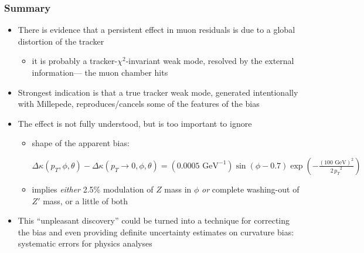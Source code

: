 \documentclass[compress]{beamer}
\begin{document}
\begin{frame}
\frametitle{Summary}
\begin{itemize}
\item There is evidence that a persistent effect in muon residuals is
  due to a global distortion of the tracker
\begin{itemize}
\item it is probably a tracker-$\chi^2$-invariant weak mode, resolved
  by the external information--- the muon chamber hits
\end{itemize}

\item Strongest indication is that a true tracker weak mode, generated
  intentionally with Millepede, reproduces/cancels some of the
  features of the bias

\item The effect is not fully understood, but is too important to ignore
\begin{itemize}
\item shape of the apparent bias:

\vspace{0.2 cm}
{\hspace{-1.5 cm}\begin{minipage}{1.2\linewidth}\scriptsize
$\displaystyle \Delta \kappa(p_T, \phi, \theta) - \Delta \kappa(p_T \to 0, \phi, \theta) = (0.0005\mbox{ GeV}^{-1}) \sin(\phi - 0.7) \exp\left(-\frac{(100\mbox{ GeV})^2}{{2 \, p_T}^2}\right)$
\end{minipage}\mbox{\hspace{-3 cm}}}

\vspace{0.2 cm}
\item implies {\it either} 2.5\% modulation of $Z$ mass in $\phi$ {\it
  or} complete washing-out of $Z'$ mass, or a little of both
\end{itemize}

\item This ``unpleasant discovery'' could be turned into a technique
  for correcting the bias and even providing definite uncertainty
  estimates on curvature bias: systematic errors for physics analyses

\end{itemize}
\end{frame}
\end{document}
